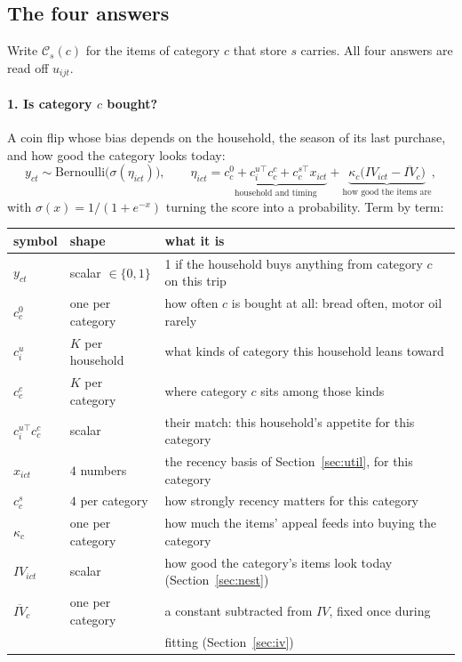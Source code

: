 \documentclass[11pt]{article}
\begin{document}
\subsection{The four answers}
\label{sec:heads}

Write $\mathcal{C}_s(c)$ for the items of category $c$ that store $s$ carries. All four
answers are read off $u_{ijt}$.

\paragraph{1. Is category $c$ bought?} A coin flip whose bias depends on the household,
the season of its last purchase, and how good the category looks today:
\begin{equation}
y_{ct}\sim\mathrm{Bernoulli}\bigl(\sigma(\eta_{ict})\bigr),\qquad
\eta_{ict}=\underbrace{c^0_c+c^{u\top}_i c^c_c+c^{s\top}_c x_{ict}}_{\text{household and timing}}
+\underbrace{\kappa_c\bigl(IV_{ict}-\overline{IV}_c\bigr)}_{\text{how good the items are}} ,
\label{eq:inc}
\end{equation}
with $\sigma(x)=1/(1+e^{-x})$ turning the score into a probability. Term by term:

\begin{center}
\begin{tabular}{lll}
\toprule
symbol & shape & what it is \\
\midrule
$y_{ct}$ & scalar $\in\{0,1\}$ & 1 if the household buys anything from category $c$ on this trip \\
$c^0_c$ & one per category & how often $c$ is bought at all: bread often, motor oil rarely \\
$c^u_i$ & $K$ per household & what kinds of category this household leans toward \\
$c^c_c$ & $K$ per category & where category $c$ sits among those kinds \\
$c^{u\top}_i c^c_c$ & scalar & their match: this household's appetite for this category \\
$x_{ict}$ & $4$ numbers & the recency basis of Section~\ref{sec:util}, for this category \\
$c^s_c$ & $4$ per category & how strongly recency matters for this category \\
$\kappa_c$ & one per category & how much the items' appeal feeds into buying the category \\
$IV_{ict}$ & scalar & how good the category's items look today (Section~\ref{sec:nest}) \\
$\overline{IV}_c$ & one per category & a constant subtracted from $IV$, fixed once during \\
 & & fitting (Section~\ref{sec:iv}) \\
\bottomrule
\end{tabular}
\end{center}
\end{document}
